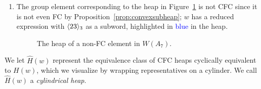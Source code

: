 \begin{example}
\begin{enumerate}[leftmargin=0.75in, label=(\alph*)]
\item The group element corresponding to the heap in Figure~\ref{fig:cylheapsex3} is not CFC since it is not even FC by Proposition~\ref{prop:convexsubheap}; $w$ has a reduced expression with $\langle 23 \rangle_3$ as a subword, highlighted in \textcolor{blue}{blue} in the heap.
\begin{center} \begin{figure}[H] \centering {} \caption{The heap of a non-FC element in $W(A_7)$.}\label{fig:cylheapsex3}
\end{figure} \end{center}
\end{enumerate}
\end{example}
    
    We let $\hat{H}(w)$ represent the equivalence class of CFC heaps cyclically equivalent to $H(w)$, which we visualize by wrapping representatives on a cylinder.
    We call $\hat{H}(w)$ a \emph{cylindrical heap}.

